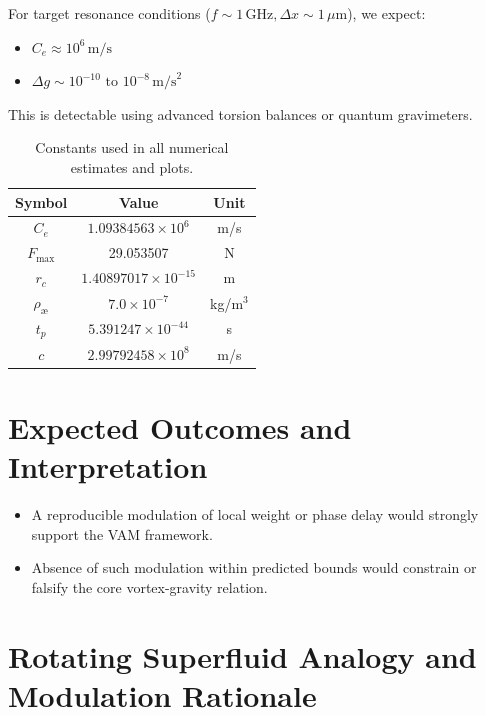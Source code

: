     For target resonance conditions (\( f \sim 1 \, \text{GHz}, \Delta x \sim 1 \, \mu\text{m} \)), we expect:
    \begin{itemize}
        \item \( C_e \approx 10^6 \, \text{m/s} \)
        \item \( \Delta g \sim 10^{-10} \text{ to } 10^{-8} \, \text{m/s}^2 \)
    \end{itemize}
    This is detectable using advanced torsion balances or quantum gravimeters.

    \begin{table}[h!]
        \centering
        \begin{tabular}{|c|c|c|}
            \hline
            \textbf{Symbol} & \textbf{Value} & \textbf{Unit} \\
            \hline
            \( C_e \) & \( 1.09384563 \times 10^6 \) & m/s \\
            \( F_{\text{max}} \) & 29.053507 & N \\
            \( r_c \) & \( 1.40897017 \times 10^{-15} \) & m \\
            \( \rho_\text{\ae} \) & \( 7.0 \times 10^{-7} \) & kg/m$^3$ \\
            \( t_p \) & \( 5.391247 \times 10^{-44} \) & s \\
            \( c \) & \( 2.99792458 \times 10^8 \) & m/s \\
            \hline
        \end{tabular}
        \caption{Constants used in all numerical estimates and plots.}
    \end{table}


    \section*{Expected Outcomes and Interpretation}
    \begin{itemize}
        \item A reproducible modulation of local weight or phase delay would strongly support the VAM framework.
        \item Absence of such modulation within predicted bounds would constrain or falsify the core vortex-gravity relation.
    \end{itemize}

    \section*{Rotating Superfluid Analogy and Modulation Rationale}

